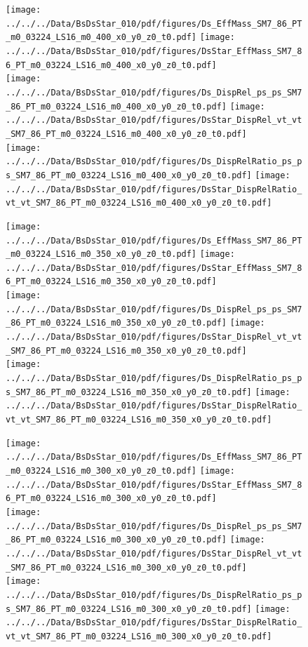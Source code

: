 \documentclass[a4paper,10pt]{article}
\begin{document}
\begin{figure}[p]
 \texttt{[image: ../../../Data/BsDsStar\_010/pdf/figures/Ds\_EffMass\_SM7\_86\_PT\_m0\_03224\_LS16\_m0\_400\_x0\_y0\_z0\_t0.pdf]}  
\texttt{[image: ../../../Data/BsDsStar\_010/pdf/figures/DsStar\_EffMass\_SM7\_86\_PT\_m0\_03224\_LS16\_m0\_400\_x0\_y0\_z0\_t0.pdf]} \\ 
\texttt{[image: ../../../Data/BsDsStar\_010/pdf/figures/Ds\_DispRel\_ps\_ps\_SM7\_86\_PT\_m0\_03224\_LS16\_m0\_400\_x0\_y0\_z0\_t0.pdf]}  
\texttt{[image: ../../../Data/BsDsStar\_010/pdf/figures/DsStar\_DispRel\_vt\_vt\_SM7\_86\_PT\_m0\_03224\_LS16\_m0\_400\_x0\_y0\_z0\_t0.pdf]} \\ 
\texttt{[image: ../../../Data/BsDsStar\_010/pdf/figures/Ds\_DispRelRatio\_ps\_ps\_SM7\_86\_PT\_m0\_03224\_LS16\_m0\_400\_x0\_y0\_z0\_t0.pdf]}  
\texttt{[image: ../../../Data/BsDsStar\_010/pdf/figures/DsStar\_DispRelRatio\_vt\_vt\_SM7\_86\_PT\_m0\_03224\_LS16\_m0\_400\_x0\_y0\_z0\_t0.pdf]} \\ 
\end{figure} 
\clearpage

\begin{figure}[p]
 \texttt{[image: ../../../Data/BsDsStar\_010/pdf/figures/Ds\_EffMass\_SM7\_86\_PT\_m0\_03224\_LS16\_m0\_350\_x0\_y0\_z0\_t0.pdf]}  
\texttt{[image: ../../../Data/BsDsStar\_010/pdf/figures/DsStar\_EffMass\_SM7\_86\_PT\_m0\_03224\_LS16\_m0\_350\_x0\_y0\_z0\_t0.pdf]} \\ 
\texttt{[image: ../../../Data/BsDsStar\_010/pdf/figures/Ds\_DispRel\_ps\_ps\_SM7\_86\_PT\_m0\_03224\_LS16\_m0\_350\_x0\_y0\_z0\_t0.pdf]}  
\texttt{[image: ../../../Data/BsDsStar\_010/pdf/figures/DsStar\_DispRel\_vt\_vt\_SM7\_86\_PT\_m0\_03224\_LS16\_m0\_350\_x0\_y0\_z0\_t0.pdf]} \\ 
\texttt{[image: ../../../Data/BsDsStar\_010/pdf/figures/Ds\_DispRelRatio\_ps\_ps\_SM7\_86\_PT\_m0\_03224\_LS16\_m0\_350\_x0\_y0\_z0\_t0.pdf]}  
\texttt{[image: ../../../Data/BsDsStar\_010/pdf/figures/DsStar\_DispRelRatio\_vt\_vt\_SM7\_86\_PT\_m0\_03224\_LS16\_m0\_350\_x0\_y0\_z0\_t0.pdf]} \\ 
\end{figure} 
\clearpage

\begin{figure}[p]
 \texttt{[image: ../../../Data/BsDsStar\_010/pdf/figures/Ds\_EffMass\_SM7\_86\_PT\_m0\_03224\_LS16\_m0\_300\_x0\_y0\_z0\_t0.pdf]}  
\texttt{[image: ../../../Data/BsDsStar\_010/pdf/figures/DsStar\_EffMass\_SM7\_86\_PT\_m0\_03224\_LS16\_m0\_300\_x0\_y0\_z0\_t0.pdf]} \\ 
\texttt{[image: ../../../Data/BsDsStar\_010/pdf/figures/Ds\_DispRel\_ps\_ps\_SM7\_86\_PT\_m0\_03224\_LS16\_m0\_300\_x0\_y0\_z0\_t0.pdf]}  
\texttt{[image: ../../../Data/BsDsStar\_010/pdf/figures/DsStar\_DispRel\_vt\_vt\_SM7\_86\_PT\_m0\_03224\_LS16\_m0\_300\_x0\_y0\_z0\_t0.pdf]} \\ 
\texttt{[image: ../../../Data/BsDsStar\_010/pdf/figures/Ds\_DispRelRatio\_ps\_ps\_SM7\_86\_PT\_m0\_03224\_LS16\_m0\_300\_x0\_y0\_z0\_t0.pdf]}  
\texttt{[image: ../../../Data/BsDsStar\_010/pdf/figures/DsStar\_DispRelRatio\_vt\_vt\_SM7\_86\_PT\_m0\_03224\_LS16\_m0\_300\_x0\_y0\_z0\_t0.pdf]} \\ 
\end{figure} 
\clearpage
\end{document}
